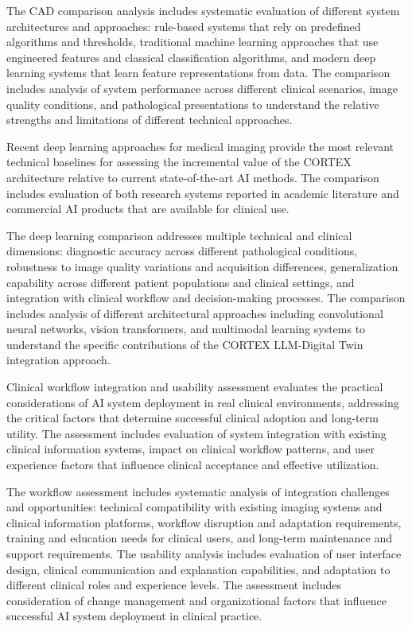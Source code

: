 The CAD comparison analysis includes systematic evaluation of different system architectures and approaches: rule-based systems that rely on predefined algorithms and thresholds, traditional machine learning approaches that use engineered features and classical classification algorithms, and modern deep learning systems that learn feature representations from data. The comparison includes analysis of system performance across different clinical scenarios, image quality conditions, and pathological presentations to understand the relative strengths and limitations of different technical approaches.

Recent deep learning approaches for medical imaging provide the most relevant technical baselines for assessing the incremental value of the CORTEX architecture relative to current state-of-the-art AI methods. The comparison includes evaluation of both research systems reported in academic literature and commercial AI products that are available for clinical use.

The deep learning comparison addresses multiple technical and clinical dimensions: diagnostic accuracy across different pathological conditions, robustness to image quality variations and acquisition differences, generalization capability across different patient populations and clinical settings, and integration with clinical workflow and decision-making processes. The comparison includes analysis of different architectural approaches including convolutional neural networks, vision transformers, and multimodal learning systems to understand the specific contributions of the CORTEX LLM-Digital Twin integration approach.

Clinical workflow integration and usability assessment evaluates the practical considerations of AI system deployment in real clinical environments, addressing the critical factors that determine successful clinical adoption and long-term utility. The assessment includes evaluation of system integration with existing clinical information systems, impact on clinical workflow patterns, and user experience factors that influence clinical acceptance and effective utilization.

The workflow assessment includes systematic analysis of integration challenges and opportunities: technical compatibility with existing imaging systems and clinical information platforms, workflow disruption and adaptation requirements, training and education needs for clinical users, and long-term maintenance and support requirements. The usability analysis includes evaluation of user interface design, clinical communication and explanation capabilities, and adaptation to different clinical roles and experience levels. The assessment includes consideration of change management and organizational factors that influence successful AI system deployment in clinical practice.

